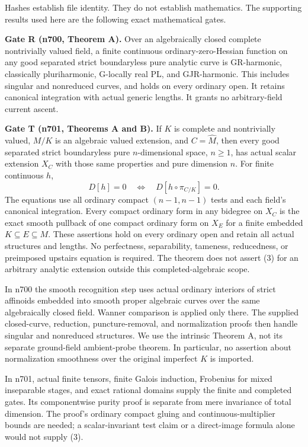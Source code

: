 \documentclass[
  11pt,
]{article}
\begin{document}
Hashes establish file identity. They do not establish mathematics. The
supporting results used here are the following exact mathematical gates.

\textbf{Gate R (n700, Theorem A).} Over an algebraically closed complete
nontrivially valued field, a finite continuous ordinary-zero-Hessian
function on any good separated strict boundaryless pure analytic curve
is GR-harmonic, classically pluriharmonic, G-locally real PL, and
GJR-harmonic. This includes singular and nonreduced curves, and holds on
every ordinary open. It retains canonical integration with actual
generic lengths. It grants no arbitrary-field current ascent.

\textbf{Gate T (n701, Theorems A and B).} If \(K\) is complete and
nontrivially valued, \(M/K\) is an algebraic valued extension, and
\(C=\widehat M\), then every good separated strict boundaryless pure
\(n\)-dimensional space, \(n\geq1\), has actual scalar extension \(X_C\)
with those same properties and pure dimension \(n\). For finite
continuous \(h\), \[
                   D[h]=0\quad\Longleftrightarrow\quad
                   D[h\circ\pi_{C/K}]=0.                 \tag{3}
\] The equations use all ordinary compact \((n-1,n-1)\) tests and each
field's canonical integration. Every compact ordinary form in any
bidegree on \(X_C\) is the exact smooth pullback of one compact ordinary
form on \(X_E\) for a finite embedded \(K\subseteq E\subseteq M\). These
assertions hold on every ordinary open and retain all actual structures
and lengths. No perfectness, separability, tameness, reducedness, or
preimposed upstairs equation is required. The theorem does not assert
(3) for an arbitrary analytic extension outside this completed-algebraic
scope.

In n700 the smooth recognition step uses actual ordinary interiors of
strict affinoids embedded into smooth proper algebraic curves over the
same algebraically closed field. Wanner comparison is applied only
there. The supplied closed-curve, reduction, puncture-removal, and
normalization proofs then handle singular and nonreduced structures. We
use the intrinsic Theorem A, not its separate ground-field ambient-probe
theorem. In particular, no assertion about normalization smoothness over
the original imperfect \(K\) is imported.

In n701, actual finite tensors, finite Galois induction, Frobenius for
mixed inseparable stages, and exact rational domains supply the finite
and completed gates. Its componentwise purity proof is separate from
mere invariance of total dimension. The proof's ordinary compact gluing
and continuous-multiplier bounds are needed; a scalar-invariant test
claim or a direct-image formula alone would not supply (3).
\end{document}
